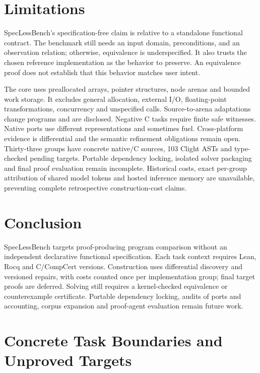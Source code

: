 \documentclass{article}
\begin{document}
\section{Limitations}

SpecLessBench's specification-free claim is relative to a standalone functional contract. The benchmark still needs an input domain, preconditions, and an observation relation; otherwise, equivalence is underspecified. It also trusts the chosen reference implementation as the behavior to preserve. An equivalence proof does not establish that this behavior matches user intent.

The core uses preallocated arrays, pointer structures, node arenas and bounded work storage. It excludes general allocation, external I/O, floating-point transformations, concurrency and unspecified calls. Source-to-arena adaptations change programs and are disclosed. Negative C tasks require finite safe witnesses. Native ports use different representations and sometimes fuel. Cross-platform evidence is differential and the semantic refinement obligations remain open. Thirty-three groups have concrete native/C sources, 103 Clight ASTs and type-checked pending targets. Portable dependency locking, isolated solver packaging and final proof evaluation remain incomplete. Historical costs, exact per-group attribution of shared model tokens and hosted inference memory are unavailable, preventing complete retrospective construction-cost claims.

\section{Conclusion}

SpecLessBench targets proof-producing program comparison without an independent declarative functional specification. Each task context requires Lean, Rocq and C/CompCert versions. Construction uses differential discovery and versioned repairs, with costs counted once per implementation group; final target proofs are deferred. Solving still requires a kernel-checked equivalence or counterexample certificate. Portable dependency locking, audits of ports and accounting, corpus expansion and proof-agent evaluation remain future work.




\appendix
\section{Concrete Task Boundaries and Unproved Targets}
\label{app:targets}
\end{document}

